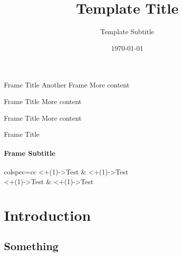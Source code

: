 \documentclass[169,9pt]{beamer}
\title{Template Title} %
\subtitle{Template Subtitle} %
\author{{First Author \and Second Author} \And {Author with a very long Name}} %
\institute{First Laboratory \\ Second Laboratory}
\date{\today} %
\begin{document}
\maketitle

\begin{frame}{Frame Title}
    Another Frame
    \pause
    More content
\end{frame}

\begin{frame}{Frame Title}
    More content
\end{frame}

\begin{frame}{Frame Title}
    More content
\end{frame}

\begin{frame}{Frame Title}
    \framesubtitle{Frame Subtitle}
    \begin{tblr}{colspec={cc}}
        \visible<+(1)->{Test} & \visible<+(1)->{Test} \\
        \visible<+(1)->{Test} & \visible<+(1)->{Test} \\
    \end{tblr}
\end{frame}

\section{Introduction}
\subsection{Something}


\appendix

\end{document}
